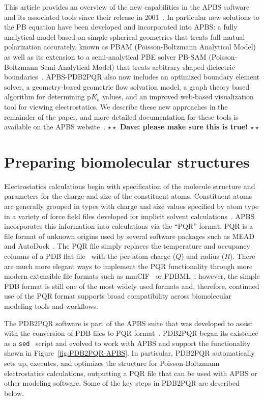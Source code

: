 \documentclass[12pt,titlepage]{article}
\newcommand{\todo}[1]{\textbf{$\star \star$ {#1} $\star \star$}}
\begin{document}
This article provides an overview of the new capabilities in the APBS software and its associated tools since their release in 2001~\cite{Holst2000, Baker2000, Baker2001a, Baker2001}.
In particular new solutions to the PB equation have been developed and incorporated into APBS: a fully analytical model based on simple spherical geometries that treats full mutual polarization accurately, known as PBAM (Poisson-Boltzmann Analytical Model)~\cite{Lotan2006, Felberg2017} as well as its extension to a semi-analytical PBE solver PB-SAM (Poisson-Boltzmann Semi-Analytical Model) that treats arbitrary shaped dielectric boundaries~\cite{Yap2010, Yap2013}.
APBS-PDB2PQR also now includes an optimized boundary element solver, a geometry-based geometric flow solvation model, a graph theory based algorithm for determining p$K_a$ values, and an improved web-based visualization tool for viewing electrostatics.
We describe these new approaches in the remainder of the paper, and more detailed documentation for these tools is available on the APBS website~\cite{APBSweb}.
\todo{Dave:  please make sure this is true!} 

\section{Preparing biomolecular structures} \label{sec:prep}
Electrostatics calculations begin with specification of the molecule structure and parameters for the charge and size of the constituent atoms.
Constituent atoms are generally grouped in types with charge and size values specified by atom type in a variety of force field files developed for implicit solvent calculations~\cite{Ren2012}.
APBS incorporates this information into calculations via the ``PQR'' format. PQR is a file format of unknown origins used by several software packages such as MEAD~\cite{Bashford1997} and AutoDock~\cite{Morris2009}.
The PQR file simply replaces the temperature and occupancy columns of a PDB flat file~\cite{PDBflat} with the per-atom charge ($Q$) and radius ($R$).
There are much more elegant ways to implement the PQR functionality through more modern extensible file formats such as mmCIF~\cite{mmCIF} or PDBML~\cite{PDBML}; however, the simple PDB format is still one of the most widely used formats and, therefore, continued use of the PQR format supports broad compatibility across biomolecular modeling tools and workflows.

The PDB2PQR software is part of the APBS suite that was developed to assist with the conversion of PDB files to PQR format~\cite{Dolinsky2004, Dolinsky2007}.
PDB2PQR began its existence as a \texttt{sed}~\cite{sed} script and evolved to work with APBS and support the functionality shown in Figure~\ref{fig:PDB2PQR-APBS}.
In particular, PDB2PQR automatically sets up, executes, and optimizes the structure for Poisson-Boltzmann electrostatics calculations, outputting a PQR file that can be used with APBS or other modeling software.
Some of the key steps in PDB2PQR are described below.
\end{document}
